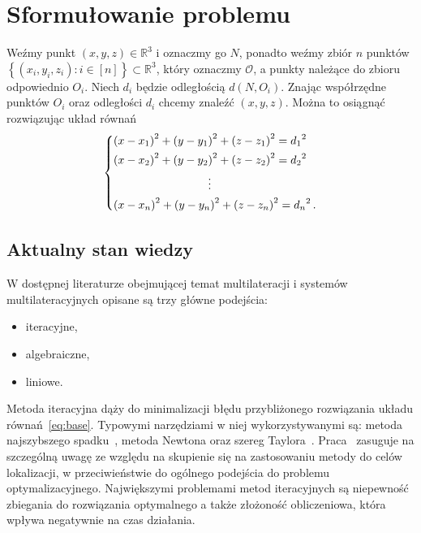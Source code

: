 \chapter{Sformułowanie problemu}\label{chap:problem}

Weźmy punkt $(x, y, z) \in \mathbb{R}^3$ i oznaczmy go $N$, ponadto weźmy zbiór $n$ punktów $\left\{(x_i, y_i, z_i): i \in [n]\right\} \subset \mathbb{R}^3$, który oznaczmy $\mathcal{O}$, a punkty należące do zbioru odpowiednio $O_i$. Niech $d_i$ będzie odległością $d(N, O_i)$. Znając współrzędne punktów $O_i$ oraz odległości $d_i$ chcemy znaleźć $(x, y, z)$. Można to osiągnąć rozwiązując układ równań
\begin{equation}\label{eq:base}
    \begin{dcases}
        {(x - x_1)}^2 + {(y - y_1)}^2 + {(z - z_1)}^2 = {d_1}^2\\
        {(x - x_2)}^2 + {(y - y_2)}^2 + {(z - z_2)}^2 = {d_2}^2\\
        \mspace{150mu}\vdots\\
        {(x - x_n)}^2 + {(y - y_n)}^2 + {(z - z_n)}^2 = {d_n}^2\,.
    \end{dcases}
\end{equation}

\section{Aktualny stan wiedzy}

W dostępnej literaturze obejmującej temat multilateracji i systemów multilateracyjnych opisane są trzy główne podejścia:

\begin{itemize}
    \item iteracyjne,
    \item algebraiczne,
    \item liniowe.
\end{itemize}

Metoda iteracyjna dąży do minimalizacji błędu przybliżonego rozwiązania układu równań~\ref{eq:base}. Typowymi narzędziami w niej wykorzystywanymi są: metoda najszybszego spadku~\cite{doi:10.1137/0111030}, metoda Newtona oraz szereg Taylora~\cite{4101619}. Praca~\cite{4101619} zasuguje na szczególną uwagę ze względu na skupienie się na zastosowaniu metody do celów lokalizacji, w przeciwieństwie do ogólnego podejścia do problemu optymalizacyjnego. Największymi problemami metod iteracyjnych są niepewność zbiegania do rozwiązania optymalnego a także złożoność obliczeniowa, która wpływa negatywnie na czas działania.

